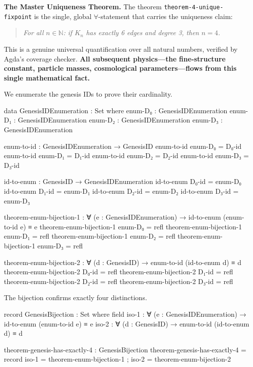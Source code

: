 \documentclass[11pt,a4paper]{book}
\begin{document}
\textbf{The Master Uniqueness Theorem.} The theorem \texttt{theorem-4-unique-fixpoint} is the single, global $\forall$-statement that carries the uniqueness claim:

\begin{quote}
\emph{For all $n \in \mathbb{N}$: if $K_n$ has exactly 6 edges and degree 3, then $n = 4$.}
\end{quote}

This is a genuine universal quantification over all natural numbers, verified by Agda's coverage checker. \textbf{All subsequent physics---the fine-structure constant, particle masses, cosmological parameters---flows from this single mathematical fact.}

We enumerate the genesis IDs to prove their cardinality.

\begin{code}
data GenesisIDEnumeration : Set where
  enum-D₀ : GenesisIDEnumeration
  enum-D₁ : GenesisIDEnumeration
  enum-D₂ : GenesisIDEnumeration
  enum-D₃ : GenesisIDEnumeration

enum-to-id : GenesisIDEnumeration → GenesisID
enum-to-id enum-D₀ = D₀-id
enum-to-id enum-D₁ = D₁-id
enum-to-id enum-D₂ = D₂-id
enum-to-id enum-D₃ = D₃-id

id-to-enum : GenesisID → GenesisIDEnumeration
id-to-enum D₀-id = enum-D₀
id-to-enum D₁-id = enum-D₁
id-to-enum D₂-id = enum-D₂
id-to-enum D₃-id = enum-D₃

theorem-enum-bijection-1 : ∀ (e : GenesisIDEnumeration) → id-to-enum (enum-to-id e) ≡ e
theorem-enum-bijection-1 enum-D₀ = refl
theorem-enum-bijection-1 enum-D₁ = refl
theorem-enum-bijection-1 enum-D₂ = refl
theorem-enum-bijection-1 enum-D₃ = refl

theorem-enum-bijection-2 : ∀ (d : GenesisID) → enum-to-id (id-to-enum d) ≡ d
theorem-enum-bijection-2 D₀-id = refl
theorem-enum-bijection-2 D₁-id = refl
theorem-enum-bijection-2 D₂-id = refl
theorem-enum-bijection-2 D₃-id = refl

\end{code}

The bijection confirms exactly four distinctions.

\begin{code}
record GenesisBijection : Set where
  field
    iso-1 : ∀ (e : GenesisIDEnumeration) → id-to-enum (enum-to-id e) ≡ e
    iso-2 : ∀ (d : GenesisID) → enum-to-id (id-to-enum d) ≡ d

theorem-genesis-has-exactly-4 : GenesisBijection
theorem-genesis-has-exactly-4 = record
  { iso-1 = theorem-enum-bijection-1
  ; iso-2 = theorem-enum-bijection-2
  }

\end{code}
\end{document}
